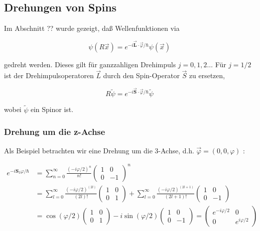\documentclass[10pt, letterpaper]{article}
\begin{document}
\subsection*{Drehungen von Spins}
Im Abschnitt ?? wurde gezeigt, daß Wellenfunktionen via

$$
\psi(R \vec{x})=e^{-i \overrightarrow{\mathbf{L}} \cdot \vec{\varphi} / \hbar} \psi(\vec{x})
$$

gedreht werden. Dieses gilt für ganzzahligen Drehimpuls $j=0,1,2 \ldots$ Für $j=1 / 2$ ist der Drehimpulsoperatoren $\vec{L}$ durch den Spin-Operator $\vec{S}$ zu ersetzen,

$$
R \tilde{\psi}=e^{-i \overrightarrow{\mathbf{S}} \cdot \vec{\varphi} / \hbar} \tilde{\psi}
$$

wobei $\tilde{\psi}$ ein Spinor ist.

\subsubsection*{Drehung um die z-Achse}
Als Beispiel betrachten wir eine Drehung um die 3-Achse, d.h. $\vec{\varphi}=(0,0, \varphi)$ :

$$
\begin{aligned}
e^{-i \mathbf{S}_{3} \varphi / \hbar} & =\sum_{n=0}^{\infty} \frac{(-i \varphi / 2)^{n}}{n!}\left(\begin{array}{cc}
1 & 0 \\
0 & -1
\end{array}\right)^{n} \\
& =\sum_{l=0}^{\infty} \frac{(-i \varphi / 2)^{(2 l)}}{(2 l)!}\left(\begin{array}{ll}
1 & 0 \\
0 & 1
\end{array}\right)+\sum_{l=0}^{\infty} \frac{(-i \varphi / 2)^{(2 l+1)}}{(2 l+1)!}\left(\begin{array}{cc}
1 & 0 \\
0 & -1
\end{array}\right) \\
& =\cos (\varphi / 2)\left(\begin{array}{ll}
1 & 0 \\
0 & 1
\end{array}\right)-i \sin (\varphi / 2)\left(\begin{array}{cc}
1 & 0 \\
0 & -1
\end{array}\right)=\left(\begin{array}{cc}
e^{-i \varphi / 2} & 0 \\
0 & e^{i \varphi / 2}
\end{array}\right)
\end{aligned}
$$
\end{document}
